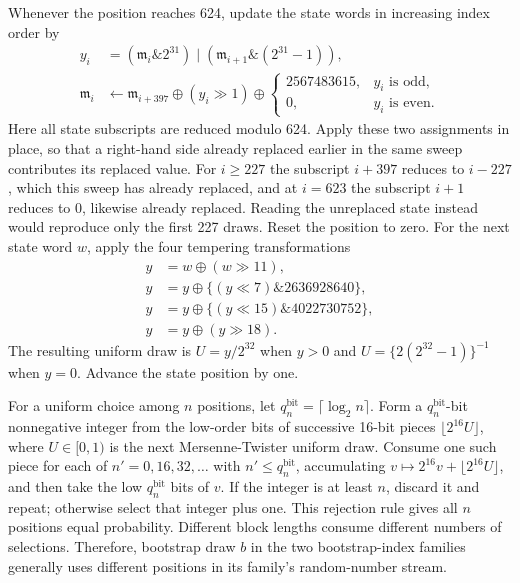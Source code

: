 \documentclass[11pt]{article}
\begin{document}
Whenever the position reaches 624, update the state words in increasing index order by
\begin{align*}
 y_i&=(\mathfrak m_i\mathbin{\&}2^{31})
      \mathbin{|}(\mathfrak m_{i+1}\mathbin{\&}(2^{31}-1)),\\
 \mathfrak m_i
 &\leftarrow\mathfrak m_{i+397}\oplus(y_i\gg1)
   \oplus
   \begin{cases}
    2567483615,&y_i\text{ is odd},\\
    0,&y_i\text{ is even}.
   \end{cases}
\end{align*}
Here all state subscripts are reduced modulo 624. Apply these two assignments in place, so that a
right-hand side already replaced earlier in the same sweep
contributes its replaced value. For \(i\ge227\) the subscript \(i+397\) reduces to \(i-227\), which
this sweep has already replaced, and at \(i=623\) the subscript \(i+1\) reduces to 0, likewise
already replaced. Reading the unreplaced state instead would reproduce only the first 227 draws.
Reset the position to zero. For the next state word
\(w\), apply the four tempering transformations
\begin{align*}
 y&=w\oplus(w\gg11),\\
 y&=y\oplus\{(y\ll7)\mathbin{\&}2636928640\},\\
 y&=y\oplus\{(y\ll15)\mathbin{\&}4022730752\},\\
 y&=y\oplus(y\gg18).
\end{align*}
The resulting uniform draw is \(U=y/2^{32}\) when \(y>0\) and
\(U=\{2(2^{32}-1)\}^{-1}\) when \(y=0\). Advance the state position by one.

For a uniform choice among \(n\) positions, let
\(q_n^{\mathrm{bit}}=\lceil\log_2 n\rceil\). Form a \(q_n^{\mathrm{bit}}\)-bit
nonnegative integer from the low-order bits of successive 16-bit pieces
\(\lfloor2^{16}U\rfloor\), where \(U\in[0,1)\) is the next Mersenne-Twister uniform draw. Consume one
such piece for each of \(n'=0,16,32,\ldots\) with \(n'\le q_n^{\mathrm{bit}}\), accumulating
\(v\mapsto2^{16}v+\lfloor2^{16}U\rfloor\), and then take the low \(q_n^{\mathrm{bit}}\) bits of
\(v\). If the
integer is at least \(n\), discard it and repeat; otherwise select that integer plus one. This
rejection rule gives all \(n\) positions equal probability. Different block lengths consume
different numbers of selections. Therefore, bootstrap draw \(b\) in the two bootstrap-index families generally uses
different positions in its family's random-number stream.
\end{document}
